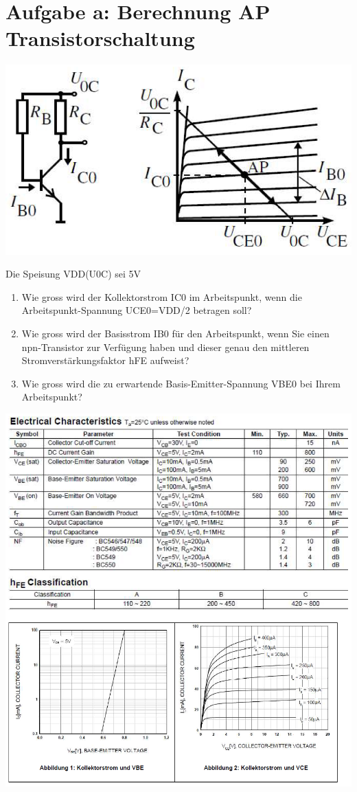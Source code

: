 \newpage
\section*{Aufgabe a: Berechnung AP Transistorschaltung}
\includegraphics[width=1\textwidth]{images/emitterStufe.png}

Die Speisung VDD(U0C) sei 5V

\begin{enumerate}
\item Wie gross wird der Kollektorstrom IC0 im Arbeitspunkt, wenn die Arbeitspunkt-Spannung
UCE0=VDD/2 betragen soll?
\item Wie gross wird der Basisstrom IB0 für den Arbeitspunkt, wenn Sie einen npn-Transistor zur Verfügung haben und dieser genau den mittleren Stromverstärkungsfaktor hFE aufweist?
\item Wie gross wird die zu erwartende Basis-Emitter-Spannung VBE0 bei Ihrem Arbeitspunkt?
\end{enumerate}

\newpage
\includegraphics[width=1\textwidth]{images/datasheetBC547.png}